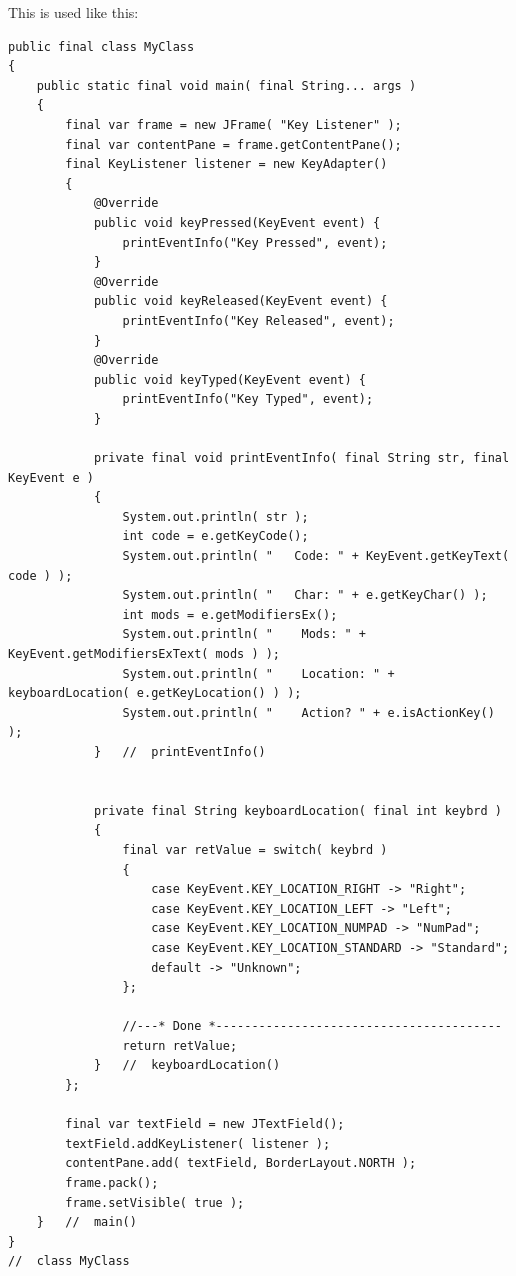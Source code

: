 \documentclass[11pt,a4paper, titlepage, parskip=half, headsepline, footsepline, cleardoublepage=current, headheight=1cm]{scrbook}
\begin{document}
This is used like this:
\begin{lstlisting}
public final class MyClass 
{
    public static final void main( final String... args ) 
    {
        final var frame = new JFrame( "Key Listener" );
        final var contentPane = frame.getContentPane();
        final KeyListener listener = new KeyAdapter() 
        {
            @Override
            public void keyPressed(KeyEvent event) {
                printEventInfo("Key Pressed", event);
            }
            @Override
            public void keyReleased(KeyEvent event) {
                printEventInfo("Key Released", event);
            }
            @Override
            public void keyTyped(KeyEvent event) {
                printEventInfo("Key Typed", event);
            }
            
            private final void printEventInfo( final String str, final KeyEvent e ) 
            {
                System.out.println( str );
                int code = e.getKeyCode();
                System.out.println( "   Code: " + KeyEvent.getKeyText( code ) );
                System.out.println( "   Char: " + e.getKeyChar() );
                int mods = e.getModifiersEx();
                System.out.println( "    Mods: " + KeyEvent.getModifiersExText( mods ) );
                System.out.println( "    Location: " + keyboardLocation( e.getKeyLocation() ) );
                System.out.println( "    Action? " + e.isActionKey() );
            }   //  printEventInfo()
            
            
            private final String keyboardLocation( final int keybrd ) 
            {
                final var retValue = switch( keybrd ) 
                {
                    case KeyEvent.KEY_LOCATION_RIGHT -> "Right";
                    case KeyEvent.KEY_LOCATION_LEFT -> "Left";
                    case KeyEvent.KEY_LOCATION_NUMPAD -> "NumPad";
                    case KeyEvent.KEY_LOCATION_STANDARD -> "Standard";
                    default -> "Unknown";
                };
                
                //---* Done *----------------------------------------
                return retValue;
            }	//	keyboardLocation()
        };
        
        final var textField = new JTextField();
        textField.addKeyListener( listener );
        contentPane.add( textField, BorderLayout.NORTH );
        frame.pack();
        frame.setVisible( true );
    }   //  main()
}
//  class MyClass
\end{lstlisting}
\end{document}
